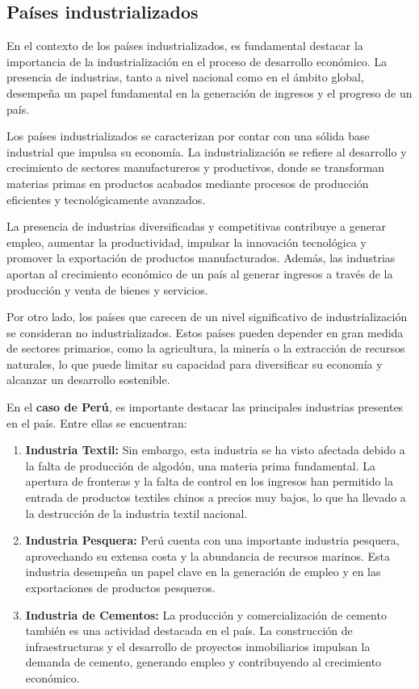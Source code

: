 \documentclass[
  letterpaper,
  DIV=11,
  numbers=noendperiod]{scrartcl}
\begin{document}
\hypertarget{pauxedses-industrializados}{%
\subsection{Países industrializados}\label{pauxedses-industrializados}}

En el contexto de los países industrializados, es fundamental destacar
la importancia de la industrialización en el proceso de desarrollo
económico. La presencia de industrias, tanto a nivel nacional como en el
ámbito global, desempeña un papel fundamental en la generación de
ingresos y el progreso de un país.

Los países industrializados se caracterizan por contar con una sólida
base industrial que impulsa su economía. La industrialización se refiere
al desarrollo y crecimiento de sectores manufactureros y productivos,
donde se transforman materias primas en productos acabados mediante
procesos de producción eficientes y tecnológicamente avanzados.

La presencia de industrias diversificadas y competitivas contribuye a
generar empleo, aumentar la productividad, impulsar la innovación
tecnológica y promover la exportación de productos manufacturados.
Además, las industrias aportan al crecimiento económico de un país al
generar ingresos a través de la producción y venta de bienes y
servicios.

Por otro lado, los países que carecen de un nivel significativo de
industrialización se consideran no industrializados. Estos países pueden
depender en gran medida de sectores primarios, como la agricultura, la
minería o la extracción de recursos naturales, lo que puede limitar su
capacidad para diversificar su economía y alcanzar un desarrollo
sostenible.

En el \textbf{caso de Perú}, es importante destacar las principales
industrias presentes en el país. Entre ellas se encuentran:

\begin{enumerate}
\def\labelenumi{\arabic{enumi}.}
\item
  \textbf{Industria Textil:} Sin embargo, esta industria se ha visto
  afectada debido a la falta de producción de algodón, una materia prima
  fundamental. La apertura de fronteras y la falta de control en los
  ingresos han permitido la entrada de productos textiles chinos a
  precios muy bajos, lo que ha llevado a la destrucción de la industria
  textil nacional.
\item
  \textbf{Industria Pesquera:} Perú cuenta con una importante industria
  pesquera, aprovechando su extensa costa y la abundancia de recursos
  marinos. Esta industria desempeña un papel clave en la generación de
  empleo y en las exportaciones de productos pesqueros.
\item
  \textbf{Industria de Cementos:} La producción y comercialización de
  cemento también es una actividad destacada en el país. La construcción
  de infraestructuras y el desarrollo de proyectos inmobiliarios
  impulsan la demanda de cemento, generando empleo y contribuyendo al
  crecimiento económico.
\end{enumerate}
\end{document}
